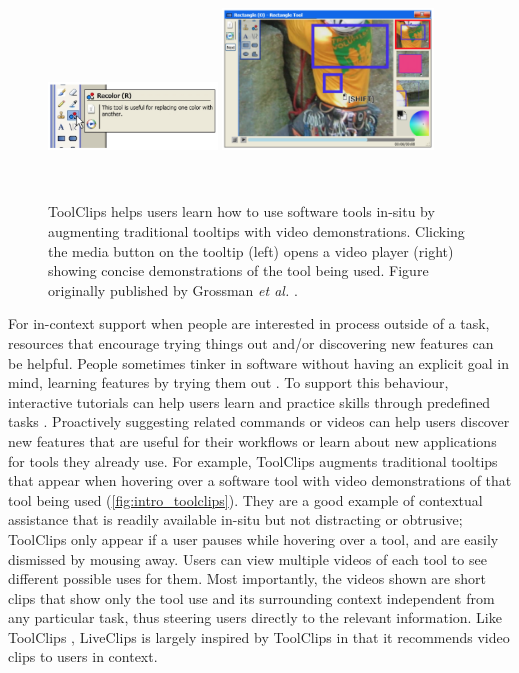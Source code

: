 \begin{figure}[b!]
\centering
  \includegraphics[width=0.4\textwidth]{figures/toolclips1.png}
  \includegraphics[width=0.5\textwidth]{figures/toolclips2.png}
  \caption[ToolClips helps users learn how to use software tools in-situ by augmenting traditional tooltips with video demonstrations. Figure originally published by Grossman \textit{et al.} \cite{Grossman2010a}.]{ToolClips helps users learn how to use software tools in-situ by augmenting traditional tooltips with video demonstrations. Clicking the media button on the tooltip (left) opens a video player (right) showing concise demonstrations of the tool being used. Figure originally published by Grossman \textit{et al.} \cite{Grossman2010a}.}~\label{fig:intro_toolclips}
\end{figure}

For in-context support when people are interested in process outside of a task, resources that encourage trying things out and/or discovering new features can be helpful. People sometimes tinker in software without having an explicit goal in mind, learning features by trying them out \cite{Burnett2016, Carroll1987}. To support this behaviour, interactive tutorials can help users learn and practice skills through predefined tasks \cite{Dontcheva2014, Lafreniere2014a, Kelleher2005}. Proactively suggesting related commands \cite{Li2011, Matejka2009} or videos \cite{Grossman2010a, Matejka2011} can help users discover new features that are useful for their workflows or learn about new applications for tools they already use. For example, ToolClips \cite{Grossman2010a} augments traditional tooltips that appear when hovering over a software tool with video demonstrations of that tool being used (\autoref{fig:intro_toolclips}). They are a good example of contextual assistance that is readily available in-situ but not distracting or obtrusive; ToolClips only appear if a user pauses while hovering over a tool, and are easily dismissed by mousing away. Users can view multiple videos of each tool to see different possible uses for them. Most importantly, the videos shown are short clips that show only the tool use and its surrounding context independent from any particular task, thus steering users directly to the relevant information. Like ToolClips \cite{Grossman2010a}, LiveClips is largely inspired by ToolClips \cite{Grossman2010a} in that it recommends video clips to users in context.

